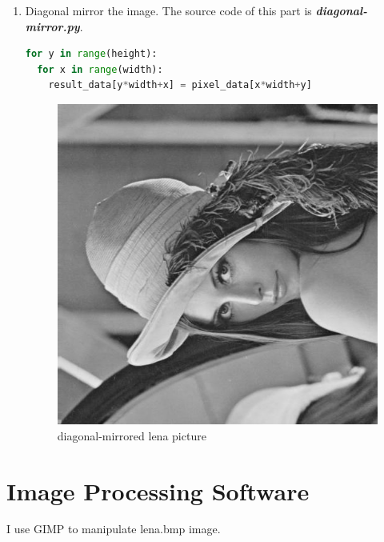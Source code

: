 \documentclass[12pt,twoside,a4paper]{article}
\begin{document}
\begin{enumerate}
\item
Diagonal mirror the image. The source code of this part is \textit{\textbf{diagonal-mirror.py}}.
\begin{lstlisting}[language=Python]
for y in range(height):
  for x in range(width):
    result_data[y*width+x] = pixel_data[x*width+y]
\end{lstlisting}
\begin{figure}[H]
\centering
\includegraphics[scale=0.4]{lena-d.jpg}
\caption{diagonal-mirrored lena picture}
\label{fig:lena-d.jpg}
\end{figure}

\end{enumerate}

\section{Image Processing Software}

I use GIMP to manipulate lena.bmp image.
\end{document}
